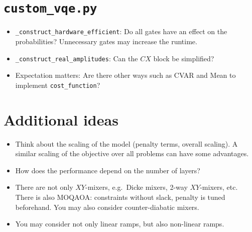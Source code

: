 \documentclass[10pt,a4paper]{article}
\begin{document}
\section*{\texttt{custom\_vqe.py}}

\begin{itemize}
    \item[1.] \texttt{\_construct\_hardware\_efficient}: Do all gates have an effect on the probabilities? Unnecessary gates may increase the runtime.



    \item[2.] \texttt{\_construct\_real\_amplitudes}: Can the $CX$ block be simplified?
    

    
    \item[3.] Expectation matters: Are there other ways such as CVAR and Mean to implement \texttt{cost\_function}?
    


\end{itemize}


\section*{Additional ideas}

\begin{itemize}
    \item[1.] Think about the scaling of the model (penalty terms, overall scaling). A similar scaling of the objective over all problems can have some advantages.
    \item[2.] How does the performance depend on the number of layers?
    \item[3.] There are not only $XY$-mixers, e.g.\ Dicke mixers, 2-way $XY$-mixers, etc. There is also MOQAOA: constraints without slack, penalty is tuned beforehand. You may also consider counter-diabatic mixers.
    \item[4.] You may consider not only linear ramps, but also non-linear ramps. 
\end{itemize}
\end{document}
